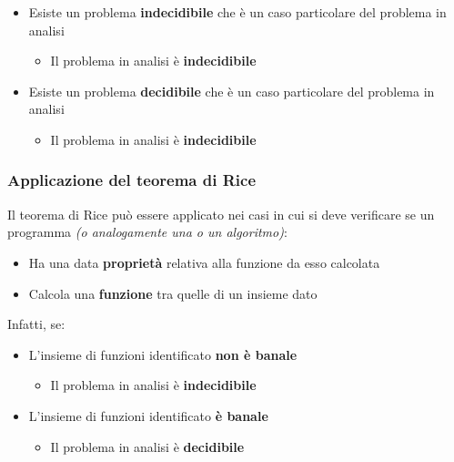 \documentclass[italian, 10pt]{article}
\begin{document}
\begin{itemize}
  \item Esiste un problema \textbf{indecidibile} che è un caso particolare del problema in analisi
        \begin{itemize}[label=\(\Rightarrow\)]
          \item Il problema in analisi è \textbf{indecidibile}
        \end{itemize}
  \item Esiste un problema \textbf{decidibile} che è un caso particolare del problema in analisi
        \begin{itemize}[label=\(\Rightarrow\)]
          \item Il problema in analisi è \textbf{indecidibile}
        \end{itemize}
\end{itemize}

\subsubsection{Applicazione del teorema di Rice}

Il teorema di Rice può essere applicato nei casi in cui si deve verificare se un programma \textit{(o analogamente una \TM o un algoritmo)}:

\begin{itemize}
  \item Ha una data \textbf{proprietà} relativa alla funzione da esso calcolata
  \item Calcola una \textbf{funzione} tra quelle di un insieme dato
\end{itemize}

Infatti, se:

\begin{itemize}
  \item L'insieme di funzioni identificato \textbf{non è banale}
        \begin{itemize}[label=\(\Rightarrow\)]
          \item Il problema in analisi è \textbf{indecidibile}
        \end{itemize}
  \item L'insieme di funzioni identificato \textbf{è banale}
        \begin{itemize}[label=\(\Rightarrow\)]
          \item Il problema in analisi è \textbf{decidibile}
        \end{itemize}
\end{itemize}
\end{document}
